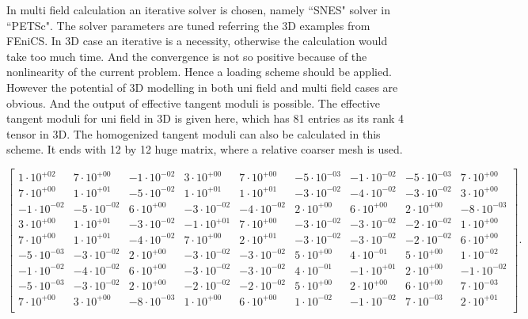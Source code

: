 In multi field calculation an iterative solver is chosen, namely ``SNES" solver in ``PETSc". The solver parameters are tuned referring the 3D examples from FEniCS. In 3D case an iterative is a necessity, otherwise the calculation would take too much time. And the convergence is not so positive because of the nonlinearity of the current problem. Hence a loading scheme should be applied. However the potential of 3D modelling in both uni field and multi field cases are obvious. And the output of effective tangent moduli is possible. The effective tangent moduli for uni field in 3D is given here, which has 81 entries as its rank 4 tensor in 3D. The homogenized tangent moduli can also be calculated in this scheme. It ends with 12 by 12 huge matrix, where a relative coarser mesh is used.
\begin{center}
\[
\begin{bmatrix}
1 \cdot 10^{+02} & 7 \cdot 10^{+00} & -1 \cdot 10^{-02} & 3 \cdot 10^{+00} & 7 \cdot 10^{+00} & -5 \cdot 10^{-03} & -1 \cdot 10^{-02} & -5 \cdot 10^{-03} & 7 \cdot 10^{+00}\\ 
7 \cdot 10^{+00} & 1 \cdot 10^{+01} & -5 \cdot 10^{-02} & 1 \cdot 10^{+01} & 1 \cdot 10^{+01} & -3 \cdot 10^{-02} & -4 \cdot 10^{-02} & -3 \cdot 10^{-02} & 3 \cdot 10^{+00}\\ 
-1 \cdot 10^{-02} & -5 \cdot 10^{-02} & 6 \cdot 10^{+00} & -3 \cdot 10^{-02} & -4 \cdot 10^{-02} & 2 \cdot 10^{+00} & 6 \cdot 10^{+00} & 2 \cdot 10^{+00} & -8 \cdot 10^{-03}\\ 
3 \cdot 10^{+00} & 1 \cdot 10^{+01} & -3 \cdot 10^{-02} & -1 \cdot 10^{+01} & 7 \cdot 10^{+00} & -3 \cdot 10^{-02} & -3 \cdot 10^{-02} & -2 \cdot 10^{-02} & 1 \cdot 10^{+00}\\ 
7 \cdot 10^{+00} & 1 \cdot 10^{+01} & -4 \cdot 10^{-02} & 7 \cdot 10^{+00} & 2 \cdot 10^{+01} & -3 \cdot 10^{-02} & -3 \cdot 10^{-02} & -2 \cdot 10^{-02} & 6 \cdot 10^{+00}\\ 
-5 \cdot 10^{-03} & -3 \cdot 10^{-02} & 2 \cdot 10^{+00} & -3 \cdot 10^{-02} & -3 \cdot 10^{-02} & 5 \cdot 10^{+00} & 4 \cdot 10^{-01} & 5 \cdot 10^{+00} & 1 \cdot 10^{-02}\\ 
-1 \cdot 10^{-02} & -4 \cdot 10^{-02} & 6 \cdot 10^{+00} & -3 \cdot 10^{-02} & -3 \cdot 10^{-02} & 4 \cdot 10^{-01} & -1 \cdot 10^{+01} & 2 \cdot 10^{+00} & -1 \cdot 10^{-02}\\ 
-5 \cdot 10^{-03} & -3 \cdot 10^{-02} & 2 \cdot 10^{+00} & -2 \cdot 10^{-02} & -2 \cdot 10^{-02} & 5 \cdot 10^{+00} & 2 \cdot 10^{+00} & 6 \cdot 10^{+00} & 7 \cdot 10^{-03}\\ 
7 \cdot 10^{+00} & 3 \cdot 10^{+00} & -8 \cdot 10^{-03} & 1 \cdot 10^{+00} & 6 \cdot 10^{+00} & 1 \cdot 10^{-02} & -1 \cdot 10^{-02} & 7 \cdot 10^{-03} & 2 \cdot 10^{+01}\\ 
\end{bmatrix}.
\]

\end{center}


